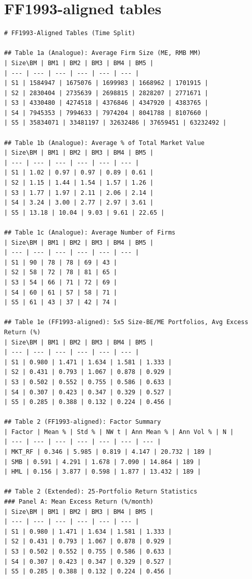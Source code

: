 \section*{FF1993-aligned tables}
\begin{verbatim}
# FF1993-Aligned Tables (Time Split)

## Table 1a (Analogue): Average Firm Size (ME, RMB MM)
| Size\BM | BM1 | BM2 | BM3 | BM4 | BM5 |
| --- | --- | --- | --- | --- | --- |
| S1 | 1584947 | 1675076 | 1699983 | 1668962 | 1701915 |
| S2 | 2830404 | 2735639 | 2698815 | 2828207 | 2771671 |
| S3 | 4330480 | 4274518 | 4376846 | 4347920 | 4383765 |
| S4 | 7945353 | 7994633 | 7974204 | 8041788 | 8107660 |
| S5 | 35834071 | 33481197 | 32632486 | 37659451 | 63232492 |

## Table 1b (Analogue): Average % of Total Market Value
| Size\BM | BM1 | BM2 | BM3 | BM4 | BM5 |
| --- | --- | --- | --- | --- | --- |
| S1 | 1.02 | 0.97 | 0.97 | 0.89 | 0.61 |
| S2 | 1.15 | 1.44 | 1.54 | 1.57 | 1.26 |
| S3 | 1.77 | 1.97 | 2.11 | 2.06 | 2.14 |
| S4 | 3.24 | 3.00 | 2.77 | 2.97 | 3.61 |
| S5 | 13.18 | 10.04 | 9.03 | 9.61 | 22.65 |

## Table 1c (Analogue): Average Number of Firms
| Size\BM | BM1 | BM2 | BM3 | BM4 | BM5 |
| --- | --- | --- | --- | --- | --- |
| S1 | 90 | 78 | 78 | 69 | 43 |
| S2 | 58 | 72 | 78 | 81 | 65 |
| S3 | 54 | 66 | 71 | 72 | 69 |
| S4 | 60 | 61 | 57 | 58 | 71 |
| S5 | 61 | 43 | 37 | 42 | 74 |

## Table 1e (FF1993-aligned): 5x5 Size-BE/ME Portfolios, Avg Excess Return (%)
| Size\BM | BM1 | BM2 | BM3 | BM4 | BM5 |
| --- | --- | --- | --- | --- | --- |
| S1 | 0.980 | 1.471 | 1.634 | 1.581 | 1.333 |
| S2 | 0.431 | 0.793 | 1.067 | 0.878 | 0.929 |
| S3 | 0.502 | 0.552 | 0.755 | 0.586 | 0.633 |
| S4 | 0.307 | 0.423 | 0.347 | 0.329 | 0.527 |
| S5 | 0.285 | 0.388 | 0.132 | 0.224 | 0.456 |

## Table 2 (FF1993-aligned): Factor Summary
| Factor | Mean % | Std % | NW t | Ann Mean % | Ann Vol % | N |
| --- | --- | --- | --- | --- | --- | --- |
| MKT_RF | 0.346 | 5.985 | 0.819 | 4.147 | 20.732 | 189 |
| SMB | 0.591 | 4.291 | 1.678 | 7.090 | 14.864 | 189 |
| HML | 0.156 | 3.877 | 0.598 | 1.877 | 13.432 | 189 |

## Table 2 (Extended): 25-Portfolio Return Statistics
### Panel A: Mean Excess Return (%/month)
| Size\BM | BM1 | BM2 | BM3 | BM4 | BM5 |
| --- | --- | --- | --- | --- | --- |
| S1 | 0.980 | 1.471 | 1.634 | 1.581 | 1.333 |
| S2 | 0.431 | 0.793 | 1.067 | 0.878 | 0.929 |
| S3 | 0.502 | 0.552 | 0.755 | 0.586 | 0.633 |
| S4 | 0.307 | 0.423 | 0.347 | 0.329 | 0.527 |
| S5 | 0.285 | 0.388 | 0.132 | 0.224 | 0.456 |


\end{verbatim}
